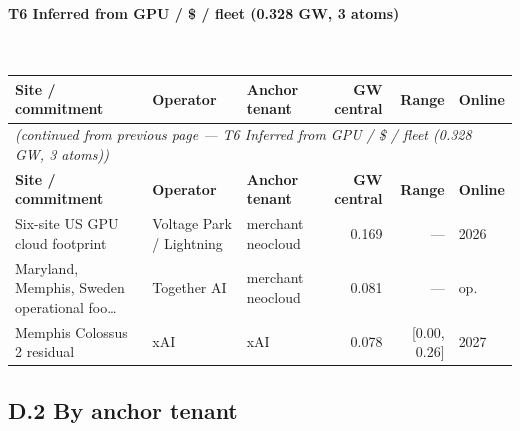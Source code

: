 \paragraph{\textbf{T6 Inferred from GPU / \$ / fleet (0.328 GW, 3 atoms)}}~\\[0.3em]
\noindent\begin{small}
\begin{longtable}{@{}p{4.5cm} p{2.4cm} p{2.4cm} r r p{1.8cm}@{}}
\toprule
\textbf{Site / commitment} & \textbf{Operator} & \textbf{Anchor tenant} & \textbf{GW central} & \textbf{Range} & \textbf{Online} \\
\midrule
\endfirsthead
\multicolumn{6}{l}{\textit{(continued from previous page — T6 Inferred from GPU / \$ / fleet (0.328 GW, 3 atoms))}} \\
\toprule
\textbf{Site / commitment} & \textbf{Operator} & \textbf{Anchor tenant} & \textbf{GW central} & \textbf{Range} & \textbf{Online} \\
\midrule
\endhead
\bottomrule
\endfoot

Six-site US GPU cloud footprint & Voltage Park / Lightning & merchant neocloud & 0.169 & — & 2026 \\

Maryland, Memphis, Sweden operational foo… & Together AI & merchant neocloud & 0.081 & — & op. \\

Memphis Colossus 2 residual & xAI & xAI & 0.078 & [0.00, 0.26] & 2027 \\

\end{longtable}\end{small}


\subsection*{D.2 \quad By anchor tenant}


